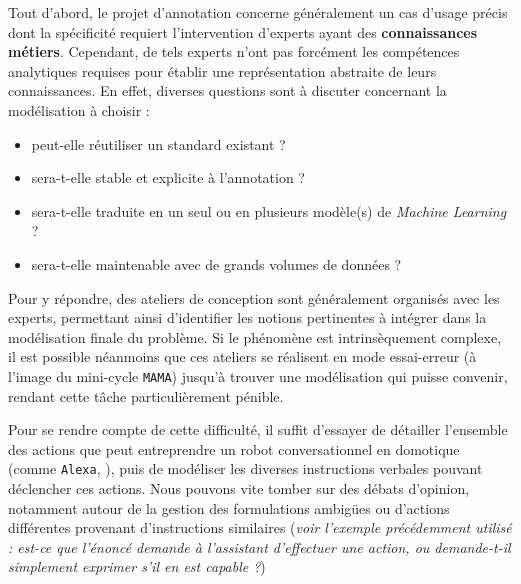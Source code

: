 			Tout d'abord, le projet d'annotation concerne généralement un cas d'usage précis dont la spécificité requiert l'intervention d'experts ayant des \textbf{connaissances métiers}.
			Cependant, de tels experts n'ont pas forcément les compétences analytiques requises pour établir une représentation abstraite de leurs connaissances.
			En effet, diverses questions sont à discuter concernant la modélisation à choisir :
			\begin{itemize}
				\item peut-elle réutiliser un standard existant ?
				\item sera-t-elle stable et explicite à l'annotation ?
				\item sera-t-elle traduite en un seul ou en plusieurs modèle(s) de \textit{Machine Learning} ?
				\item sera-t-elle maintenable avec de grands volumes de données ?
			\end{itemize}
			Pour y répondre, des ateliers de conception sont généralement organisés avec les experts, permettant ainsi d'identifier les notions pertinentes à intégrer dans la modélisation finale du problème.
			Si le phénomène est intrinsèquement complexe, il est possible néanmoins que ces ateliers se réalisent en mode essai-erreur (à l'image du mini-cycle \texttt{MAMA}) jusqu'à trouver une modélisation qui puisse convenir, rendant cette tâche particulièrement pénible.
			\begin{leftBarExamples}
				Pour se rendre compte de cette difficulté, il suffit d'essayer de détailler l'ensemble des actions que peut entreprendre un robot conversationnel en domotique (comme \texttt{Alexa}, \cite{alexa-internet:2018:keyword-research-competitor}), puis de modéliser les diverses instructions verbales pouvant déclencher ces actions.
				Nous pouvons vite tomber sur des débats d'opinion, notamment autour de la gestion des formulations ambigües ou d'actions différentes provenant d'instructions similaires (\textit{voir l'exemple précédemment utilisé : est-ce que l'énoncé  demande à l'assistant d'effectuer une action, ou demande-t-il simplement exprimer s'il en est capable ?})
			\end{leftBarExamples}
			
